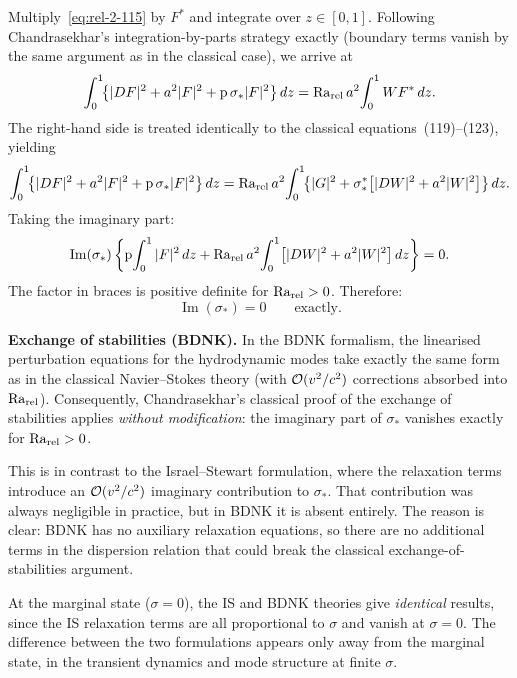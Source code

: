 Multiply~\eqref{eq:rel-2-115} by $F^*$ and integrate over
$z \in [0,1]$.  Following Chandrasekhar's integration-by-parts strategy
exactly (boundary terms vanish by the same argument as in the classical
case), we arrive at
\begin{equation}
\label{eq:rel-2-118}
\int_0^1\!\bigl\{|DF|^2 + a^2|F|^2
  + \mathrm{p}\,\sigma_*|F|^2\bigr\}\,dz
  = \mathrm{Ra}_{\mathrm{rel}}\, a^2\!\int_0^1 W F^*\,dz.
\end{equation}
The right-hand side is treated identically to the classical
equations~(119)--(123), yielding
\begin{equation}
\label{eq:rel-2-124}
\int_0^1\!\bigl\{|DF|^2 + a^2|F|^2
  + \mathrm{p}\,\sigma_*|F|^2\bigr\}\,dz
  = \mathrm{Ra}_{\mathrm{rel}}\, a^2\!\int_0^1\!\bigl\{|G|^2
    + \sigma_*^*\bigl[|DW|^2 + a^2|W|^2\bigr]\bigr\}\,dz.
\end{equation}
Taking the imaginary part:
\begin{equation}
\label{eq:rel-2-125}
\operatorname{Im}(\sigma_*)
  \left\{\mathrm{p}\!\int_0^1|F|^2\,dz
    + \mathrm{Ra}_{\mathrm{rel}}\, a^2\!\int_0^1
      \bigl[|DW|^2 + a^2|W|^2\bigr]\,dz\right\}
= 0.
\end{equation}
The factor in braces is positive definite for $\mathrm{Ra}_{\mathrm{rel}} > 0$.
Therefore:
\begin{equation}
\label{eq:rel-2-126}
\operatorname{Im}(\sigma_*) = 0 \qquad\text{exactly}.
\end{equation}

\begin{relcorrection}
\textbf{Exchange of stabilities (BDNK).}
In the BDNK formalism, the linearised perturbation equations for the
hydrodynamic modes take exactly the same form as in the classical
Navier--Stokes theory (with $\mathcal{O}(v^2/c^2)$ corrections absorbed into
$\mathrm{Ra}_{\mathrm{rel}}$).  Consequently, Chandrasekhar's classical proof of the exchange
of stabilities applies \emph{without modification}: the imaginary part
of $\sigma_*$ vanishes exactly for $\mathrm{Ra}_{\mathrm{rel}} > 0$.

This is in contrast to the Israel--Stewart formulation, where the
relaxation terms introduce an $\mathcal{O}(v^2/c^2)$ imaginary contribution
to $\sigma_*$.  That contribution was always negligible in practice, but
in BDNK it is absent entirely.  The reason is clear: BDNK has no auxiliary
relaxation equations, so there are no additional terms in the dispersion
relation that could break the classical exchange-of-stabilities argument.

At the marginal state ($\sigma = 0$), the IS and BDNK theories give
\emph{identical} results, since the IS relaxation terms are all
proportional to $\sigma$ and vanish at $\sigma = 0$.  The difference
between the two formulations appears only away from the marginal state,
in the transient dynamics and mode structure at finite $\sigma$.
\end{relcorrection}

